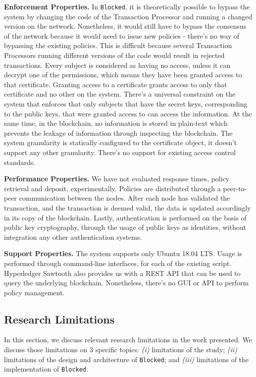 \textbf{Enforcement Properties.} In \texttt{Blocked}, it is theoretically possible to bypass the system by changing the code of the Transaction Processor and running a changed version on the network. Nonetheless, it would still have to bypass the consensus of the network because it would need to issue new policies - there's no way of bypassing the existing policies. This is difficult because several Transaction Processors running different versions of the code would result in rejected transactions. Every subject is considered as having no access, unless it can decrypt one of the permissions, which means they have been granted access to that certificate. Granting access to a certificate grants access to only that certificate and no other on the system. There's a universal constraint on the system that enforces that only subjects that have the secret keys, corresponding to the public keys, that were granted access to can access the information. At the same time, in the blockchain, no information is stored in plain-text which prevents the leakage of information through inspecting the blockchain. The system granularity is statically configured to the certificate object, it doesn't support any other granularity. There's no support for existing access control standards.

\textbf{Performance Properties.} We have not evaluated response times, policy retrieval and deposit, experimentally. Policies are distributed through a peer-to-peer communication between the nodes. After each node has validated the transaction, and the transaction is deemed valid, the data is updated accordingly in its copy of the blockchain. Lastly, authentication is performed on the basis of public key cryptography, through the usage of public keys as identities, without integration any other authentication systems.

\textbf{Support Properties.} The system supports only Ubuntu 18.04 LTS. Usage is performed through command-line interfaces, for each of the existing script. Hyperledger Sawtooth also provides us with a REST API that can be used to query the underlying blockchain. Nonetheless, there's no GUI or API to perform policy management.

\subsection{Research Limitations}
\label{sec:eval-limitations}

In this section, we discuss relevant research limitations in the work presented. We discuss those limitations on 3 specific topics: \emph{(i)} limitations of the study; \emph{(ii)} limitations of the design and architecture of \texttt{Blocked}; and \emph{(iii)} limitations of the implementation of \texttt{Blocked}.

